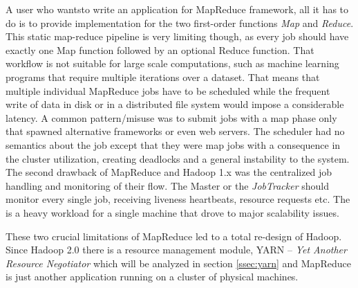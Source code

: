 A user who wantsto write an application for MapReduce framework,
all it has to do is to provide implementation for the two
first-order functions \emph{Map} and \emph{Reduce}. This static
map-reduce pipeline is very limiting though, as every job should have exactly one
Map function followed by an optional Reduce function. That workflow is
not suitable for large scale computations, such as machine learning
programs that require multiple iterations over a dataset. That means
that multiple individual MapReduce jobs have to be scheduled while the
frequent write of data in disk or in a distributed file system would
impose a considerable latency. A common pattern/misuse
\cite{Vavilapalli:2013:AHY:2523616.2523633} was to submit jobs with a
map phase only that spawned alternative frameworks or even web
servers. The scheduler had no semantics about the job except that they
were map jobs with a consequence in the cluster utilization, creating
deadlocks and a general instability to the system. The second drawback
of MapReduce and Hadoop 1.x was the centralized job handling and
monitoring of their flow. The Master or the \emph{JobTracker} should
monitor every single job, receiving liveness heartbeats, resource
requests etc. The is a heavy workload for a single machine that drove
to major scalability issues.

These two crucial limitations of MapReduce led to a total re-design of
Hadoop. Since Hadoop 2.0 there is a resource management module, YARN --
\emph{Yet Another Resource Negotiator} which will be analyzed in
section \ref{ssec:yarn} and MapReduce is just another application
running on a cluster of physical machines.